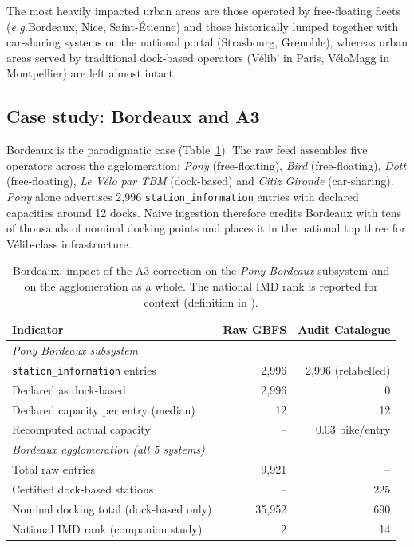 \documentclass[11pt,a4paper]{article}
\newcommand{\eg}{\emph{e.g.}}
\begin{document}
The most heavily impacted urban areas are those operated by
free-floating fleets (\eg Bordeaux, Nice, Saint-\'Etienne) and those
historically lumped together with car-sharing systems on the national
portal (Strasbourg, Grenoble), whereas urban areas served by
traditional dock-based operators (V\'elib' in Paris, V\'eloMagg in
Montpellier) are left almost intact.

\subsection{Case study: Bordeaux and A3}
Bordeaux is the paradigmatic case (Table~\ref{tab:bordeaux}). The raw
feed assembles five operators across the agglomeration: \emph{Pony}
(free-floating), \emph{Bird} (free-floating), \emph{Dott}
(free-floating), \emph{Le V\'elo par TBM} (dock-based) and \emph{Citiz
Gironde} (car-sharing). \emph{Pony} alone advertises 2{,}996
\texttt{station\_information} entries with declared capacities around
12 docks. Naive ingestion therefore credits Bordeaux with tens of
thousands of nominal docking points and places it in the national top
three for V\'elib-class infrastructure.

\begin{table}[ht]
\centering
\caption{Bordeaux: impact of the A3 correction on the
\emph{Pony Bordeaux} subsystem and on the agglomeration as a whole.
The national IMD rank is reported for context (definition in
\cite{Fosse2026imd}).}
\label{tab:bordeaux}
\small
\begin{tabular}{@{}lrr@{}}
\toprule
\textbf{Indicator} & \textbf{Raw GBFS} & \textbf{Audit Catalogue}\\
\midrule
\textit{Pony Bordeaux subsystem} & & \\
\quad \texttt{station\_information} entries & 2{,}996 & 2{,}996 (relabelled) \\
\quad Declared as dock-based                 & 2{,}996 & 0 \\
\quad Declared capacity per entry (median)   & 12      & 12 \\
\quad Recomputed actual capacity             & --      & 0.03 bike/entry \\
\midrule
\textit{Bordeaux agglomeration (all 5 systems)} & & \\
\quad Total raw entries                      & 9{,}921 & -- \\
\quad Certified dock-based stations           & --      & 225 \\
\quad Nominal docking total (dock-based only) & 35{,}952 & 690 \\
\quad National IMD rank (companion study)     & 2       & 14 \\
\bottomrule
\end{tabular}
\end{table}
\end{document}
